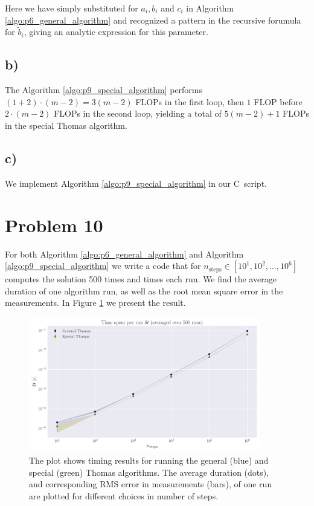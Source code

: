 \documentclass[english,notitlepage,nofootinbib]{revtex4-1}  %
\newcommand{\Fig}[1]{Figure \ref{fig:#1}}
\newcommand{\Algo}[1]{Algorithm \ref{algo:#1}}
\newcommand{\CC}{C\nolinebreak\hspace{-.05em}\raisebox{.4ex}{\tiny\bf +}\nolinebreak\hspace{-.10em}\raisebox{.4ex}{\tiny\bf +}}
\begin{document}
Here we have simply substituted for $a_i, b_i$ and $c_i$ in \Algo{p6_general_algorithm} and recognized a pattern in the recursive forumula for $\tilde{b}_i$, giving an analytic expression for this parameter.


\subsection*{b)}

The \Algo{p9_special_algorithm} performs $(1+2)\cdot (m-2) = 3(m-2)$ FLOPs in the first loop, then $1$ FLOP before $2 \cdot (m-2)$ FLOPs in the second loop, yielding a total of $5(m-2)+1$ FLOPs in the special Thomas algorithm.

\subsection*{c)}

We implement \Algo{p9_special_algorithm} in our \CC\, script. 

\section*{Problem 10}

For both \Algo{p6_general_algorithm} and \Algo{p9_special_algorithm} we write a code that for $n_\text{steps}\in[10^{1}, 10^{2}, \dots, 10^{6}]$ computes the solution 500 times and times each run. We find the average duration of one algorithm run, as well as the root mean square error in the measurements. In \Fig{p10_timed} we present the result.

\begin{center}
    
\end{center}

\begin{figure}[h!]
    \centering
    \includegraphics[width=0.9\textwidth]{algorithms_timed.pdf}
    \caption{ The plot shows timing results for running the general (blue) and special (green) Thomas algorithms. The average duration (dots), and corresponding RMS error in measurements (bars), of one run are plotted for different choices in number of steps.}\label{fig:p10_timed}
\end{figure}
\end{document}
